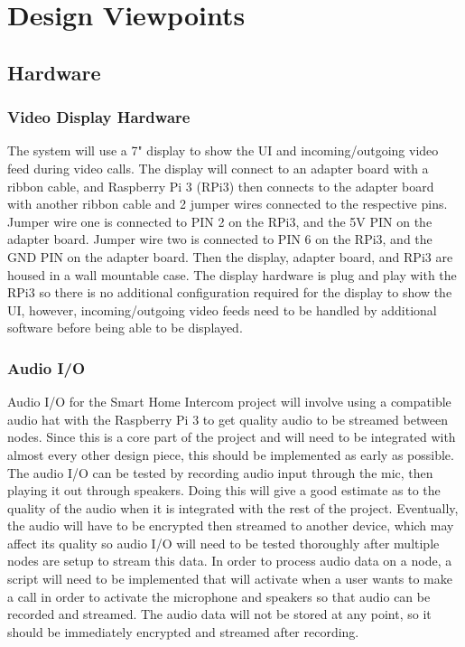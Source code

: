 \documentclass[onecolumn, draftclsnofoot,10pt, compsoc]{IEEEtran}
\begin{document}
\section{Design Viewpoints}

\subsection{Hardware}
\subsubsection{Video Display Hardware}
The system will use a 7" display to show the UI and incoming/outgoing video feed during video calls.
The display will connect to an adapter board with a ribbon cable, and Raspberry Pi 3 (RPi3) then connects to the adapter board with another ribbon cable and 2 jumper wires connected to the respective pins.
Jumper wire one is connected to PIN 2 on the RPi3, and the 5V PIN on the adapter board. Jumper wire two is connected to PIN 6 on the RPi3, and the GND PIN on the adapter board. Then the display, adapter board, and RPi3 are housed in a wall mountable case. The display hardware is plug and play with the RPi3 so there is no additional configuration required for the display to show the UI, however, incoming/outgoing video feeds need to be handled by additional software before being able to be displayed.

\subsubsection{Audio I/O}
Audio I/O for the Smart Home Intercom project will involve using a compatible audio hat with the Raspberry Pi 3 to get quality audio to be streamed between nodes. Since this is a core part of the project and will need to be integrated with almost every other design piece, this should be implemented as early as possible. The audio I/O can be tested by recording audio input through the mic, then playing it out through speakers. Doing this will give a good estimate as to the quality of the audio when it is integrated with the rest of the project. Eventually, the audio will have to be encrypted then streamed to another device, which may affect its quality so audio I/O will need to be tested thoroughly after multiple nodes are setup to stream this data. In order to process audio data on a node, a script will need to be implemented that will activate when a user wants to make a call in order to activate the microphone and speakers so that audio can be recorded and streamed. The audio data will not be stored at any point, so it should be immediately encrypted and streamed after recording.
\end{document}

